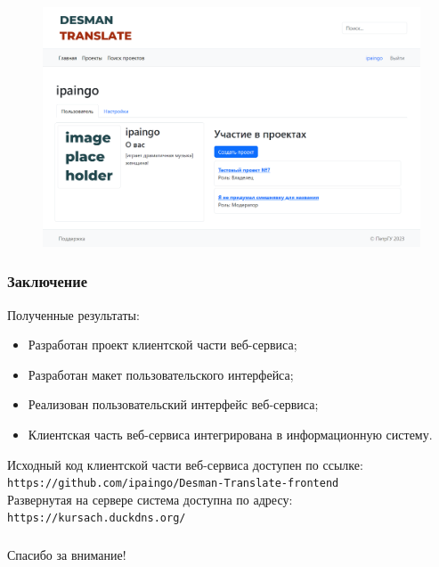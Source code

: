 \documentclass[hyperref={unicode}]{beamer}
\begin{document}
\begin{frame}
	\begin{figure}
	\includegraphics[width=\textwidth]{images/profile.png}
	\end{figure}
\end{frame}

% 	
	
	

 \begin{frame}
 	\frametitle{Заключение}
	
 	Полученные результаты:
	
 	\begin{itemize}
 		\item Разработан проект клиентской части веб-сервиса;
		\item Разработан макет пользовательского интерфейса;
 		\item Реализован пользовательский интерфейс веб-сервиса;
		\item Клиентская часть веб-сервиса интегрирована в информационную систему.
 	\end{itemize}
	Исходный код клиентской части веб-сервиса доступен по ссылке:
	\texttt{https://github.com/ipaingo/Desman-Translate-frontend}
	\\
	Развернутая на сервере система доступна по адресу:
	\texttt{https://kursach.duckdns.org/}
	
\end{frame}

 \begin{frame}
 	\frametitle{}
\begin{center}
 {\Large\mbox{}Спасибо за внимание!}
\end{center}
 \end{frame}
\end{document}
